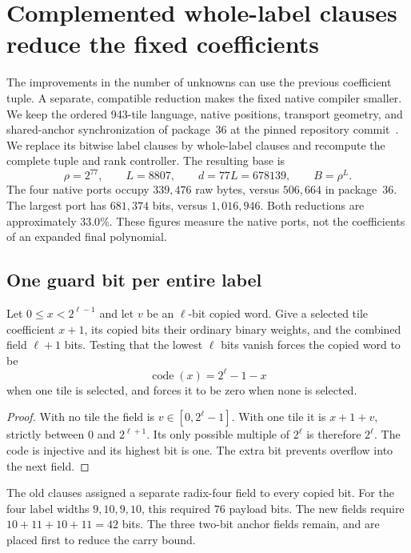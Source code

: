 \section{Complemented whole-label clauses reduce the fixed coefficients}
\label{sec:complemented-compiler}

The improvements in the number of unknowns can use the previous coefficient
tuple.  A separate, compatible reduction makes the fixed native compiler
smaller.  We keep the ordered 943-tile language, native positions, transport
geometry, and shared-anchor synchronization of package~36 at the pinned
repository commit~\cite{repo}.  We replace its bitwise label clauses by
whole-label clauses and recompute the complete tuple and rank controller.
The resulting base is
\[
 \rho=2^{77},\qquad L=8807,\qquad d=77L=678139,\qquad B=\rho^L.
\]
The four native ports occupy $339{,}476$ raw bytes, versus $506{,}664$ in
package~36.  The largest port has $681{,}374$ bits, versus $1{,}016{,}946$.
Both reductions are approximately $33.0\%$.  These figures measure the
native ports, not the coefficients of an expanded final polynomial.

\subsection{One guard bit per entire label}

\begin{lemma}
Let $0\le x<2^{\ell-1}$ and let $v$ be an $\ell$-bit copied word.
Give a selected tile coefficient $x+1$, its copied bits their ordinary
binary weights, and the combined field $\ell+1$ bits.  Testing that the
lowest $\ell$ bits vanish forces the copied word to be
\[
 \operatorname{code}(x)=2^\ell-1-x
\]
when one tile is selected, and forces it to be zero when none is selected.
\end{lemma}

\begin{proof}
With no tile the field is $v\in[0,2^\ell-1]$.  With one tile it is
$x+1+v$, strictly between $0$ and $2^{\ell+1}$.  Its only possible multiple
of $2^\ell$ is therefore $2^\ell$.  The code is injective and its highest
bit is one.  The extra bit prevents overflow into the next field.
\end{proof}

The old clauses assigned a separate radix-four field to every copied bit.
For the four label widths $9,10,9,10$, this required $76$ payload bits.
The new fields require $10+11+10+11=42$ bits.  The three two-bit anchor
fields remain, and are placed first to reduce the carry bound.

